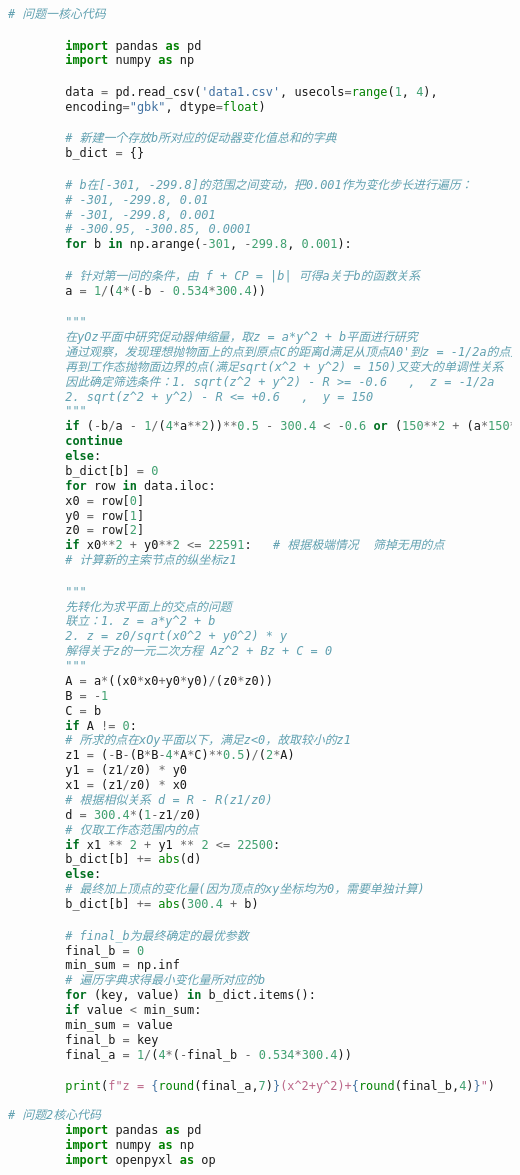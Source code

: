\documentclass{myclass}
\begin{document}
\begin{appendices}  
		\begin{lstlisting}[language={python}]  
		# 问题一核心代码

		import pandas as pd
		import numpy as np

		data = pd.read_csv('data1.csv', usecols=range(1, 4),
		encoding="gbk", dtype=float)

		# 新建一个存放b所对应的促动器变化值总和的字典
		b_dict = {}

		# b在[-301, -299.8]的范围之间变动，把0.001作为变化步长进行遍历：
		# -301, -299.8, 0.01
		# -301, -299.8, 0.001
		# -300.95, -300.85, 0.0001
		for b in np.arange(-301, -299.8, 0.001):

		# 针对第一问的条件，由 f + CP = |b| 可得a关于b的函数关系
		a = 1/(4*(-b - 0.534*300.4))

		"""
		在yOz平面中研究促动器伸缩量，取z = a*y^2 + b平面进行研究
		通过观察，发现理想抛物面上的点到原点C的距离d满足从顶点A0'到z = -1/2a的点先变小，
		再到工作态抛物面边界的点(满足sqrt(x^2 + y^2) = 150)又变大的单调性关系
		因此确定筛选条件：1. sqrt(z^2 + y^2) - R >= -0.6   ,  z = -1/2a
		2. sqrt(z^2 + y^2) - R <= +0.6   ,  y = 150
		"""
		if (-b/a - 1/(4*a**2))**0.5 - 300.4 < -0.6 or (150**2 + (a*150**2+b)**2)**0.5 - 300.4 > 0.6:
		continue
		else:
		b_dict[b] = 0
		for row in data.iloc:
		x0 = row[0]
		y0 = row[1]
		z0 = row[2]
		if x0**2 + y0**2 <= 22591:   # 根据极端情况  筛掉无用的点
		# 计算新的主索节点的纵坐标z1

		"""
		先转化为求平面上的交点的问题
		联立：1. z = a*y^2 + b
		2. z = z0/sqrt(x0^2 + y0^2) * y
		解得关于z的一元二次方程 Az^2 + Bz + C = 0
		"""
		A = a*((x0*x0+y0*y0)/(z0*z0))
		B = -1
		C = b
		if A != 0:
		# 所求的点在xOy平面以下，满足z<0，故取较小的z1
		z1 = (-B-(B*B-4*A*C)**0.5)/(2*A)
		y1 = (z1/z0) * y0
		x1 = (z1/z0) * x0
		# 根据相似关系 d = R - R(z1/z0)
		d = 300.4*(1-z1/z0)
		# 仅取工作态范围内的点
		if x1 ** 2 + y1 ** 2 <= 22500:
		b_dict[b] += abs(d)
		else:
		# 最终加上顶点的变化量(因为顶点的xy坐标均为0，需要单独计算)
		b_dict[b] += abs(300.4 + b)

		# final_b为最终确定的最优参数
		final_b = 0
		min_sum = np.inf
		# 遍历字典求得最小变化量所对应的b
		for (key, value) in b_dict.items():
		if value < min_sum:
		min_sum = value
		final_b = key
		final_a = 1/(4*(-final_b - 0.534*300.4))

		print(f"z = {round(final_a,7)}(x^2+y^2)+{round(final_b,4)}")

		\end{lstlisting}  %
		\begin{lstlisting}[language={python}]  
		# 问题2核心代码
		import pandas as pd
		import numpy as np
		import openpyxl as op


\end{lstlisting}
\end{appendices}
\end{document}
